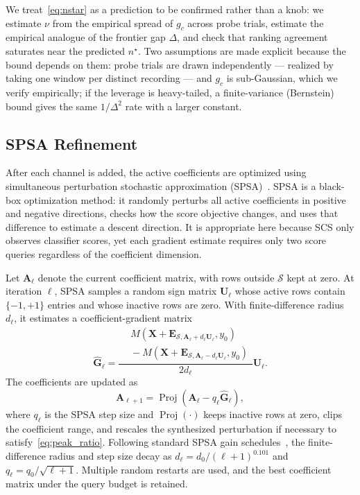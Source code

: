 \documentclass[journal]{IEEEtran}
\begin{document}
We treat~\eqref{eq:nstar} as a prediction to be confirmed rather than a knob: we estimate $\nu$ from the empirical spread of $g_c$ across probe trials, estimate the empirical analogue of the frontier gap $\Delta$, and check that ranking agreement saturates near the predicted $n^\star$. Two assumptions are made explicit because the bound depends on them: probe trials are drawn independently --- realized by taking one window per distinct recording --- and $g_c$ is sub-Gaussian, which we verify empirically; if the leverage is heavy-tailed, a finite-variance (Bernstein) bound gives the same $1/\Delta^2$ rate with a larger constant.

\subsection{SPSA Refinement}
\label{subsec:spsa}

After each channel is added, the active coefficients are optimized using simultaneous perturbation stochastic approximation (SPSA)~\cite{spall1992spsa}. SPSA is a black-box optimization method: it randomly perturbs all active coefficients in positive and negative directions, checks how the score objective changes, and uses that difference to estimate a descent direction. It is appropriate here because SCS only observes classifier scores, yet each gradient estimate requires only two score queries regardless of the coefficient dimension.

Let $\mathbf{A}_\ell$ denote the current coefficient matrix, with rows outside $\mathcal{S}$ kept at zero. At iteration $\ell$, SPSA samples a random sign matrix $\mathbf{U}_\ell$ whose active rows contain $\{-1,+1\}$ entries and whose inactive rows are zero. With finite-difference radius $d_\ell$, it estimates a coefficient-gradient matrix
\begin{equation}
\widehat{\mathbf{G}}_\ell=
\frac{
\begin{aligned}
&M(\mathbf{X}+\mathbf{E}_{\mathcal{S},\mathbf{A}_\ell+d_\ell\mathbf{U}_\ell},y_0)\\
&{}-M(\mathbf{X}+\mathbf{E}_{\mathcal{S},\mathbf{A}_\ell-d_\ell\mathbf{U}_\ell},y_0)
\end{aligned}}
{2d_\ell}\mathbf{U}_\ell .
\label{eq:spsa_grad}
\end{equation}
The coefficients are updated as
\begin{equation}
\mathbf{A}_{\ell+1}
=\operatorname{Proj}\!\left(\mathbf{A}_\ell-q_\ell\widehat{\mathbf{G}}_\ell\right),
\label{eq:spsa_update}
\end{equation}
where $q_\ell$ is the SPSA step size and $\operatorname{Proj}(\cdot)$ keeps inactive rows at zero, clips the coefficient range, and rescales the synthesized perturbation if necessary to satisfy~\eqref{eq:peak_ratio}. Following standard SPSA gain schedules~\cite{spall1992spsa}, the finite-difference radius and step size decay as $d_\ell=d_0/(\ell+1)^{0.101}$ and $q_\ell=q_0/\sqrt{\ell+1}$. Multiple random restarts are used, and the best coefficient matrix under the query budget is retained.
\end{document}
